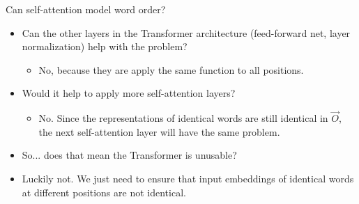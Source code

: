 
\begin{vbframe}{Can self-attention model word order?}

\vfill

\begin{itemize}
\item \ques Can the other layers in the Transformer architecture (feed-forward net, layer normalization) help with the problem?
\begin{itemize}
\item No, because they are apply the same function to all positions.
\end{itemize}
\item \ques Would it help to apply more self-attention layers?
\begin{itemize}
\item No. Since the representations of identical words are still identical in $\vec O$, the next self-attention layer will have the same problem.
\end{itemize}
\item So... does that mean the Transformer is unusable?
\item Luckily not. We just need to ensure that input embeddings of identical words at different positions are not identical. 
\end{itemize}

\vfill

\end{vbframe}


